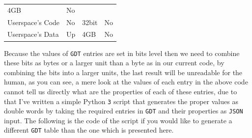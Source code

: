 \begin{longtable}[]{@{}llll@{}}
\begin{minipage}[t]{0.29\columnwidth}
4GB\strut
\end{minipage} & \begin{minipage}[t]{0.09\columnwidth}\raggedright\strut
No\strut
\end{minipage}\tabularnewline
\begin{minipage}[t]{0.20\columnwidth}\raggedright\strut
Userspace's Code\strut
\end{minipage} & \begin{minipage}[t]{0.30\columnwidth}\raggedright\strut
No\strut
\end{minipage} & \begin{minipage}[t]{0.29\columnwidth}\raggedright\strut
32bit\strut
\end{minipage} & \begin{minipage}[t]{0.09\columnwidth}\raggedright\strut
No\strut
\end{minipage}\tabularnewline
\begin{minipage}[t]{0.20\columnwidth}\raggedright\strut
Userspace's Data\strut
\end{minipage} & \begin{minipage}[t]{0.30\columnwidth}\raggedright\strut
Up\strut
\end{minipage} & \begin{minipage}[t]{0.29\columnwidth}\raggedright\strut
4GB\strut
\end{minipage} & \begin{minipage}[t]{0.09\columnwidth}\raggedright\strut
No\strut
\end{minipage}\tabularnewline
\bottomrule
\end{longtable}

Because the values of \lstinline!GDT! entries are set in bits level then
we need to combine these bits as bytes or a larger unit than a byte as
in our current code, by combining the bits into a larger units, the last
result will be unreadable for the human, as you can see, a mere look at
the values of each entry in the above code cannot tell us directly what
are the properties of each of these entries, due to that I've written a
simple Python \lstinline!3! script that generates the proper values as
double words by taking the required entries in \lstinline!GDT! and their
properties as \lstinline!JSON! input. The following is the code of the
script if you would like to generate a different \lstinline!GDT! table
than the one which is presented here.

